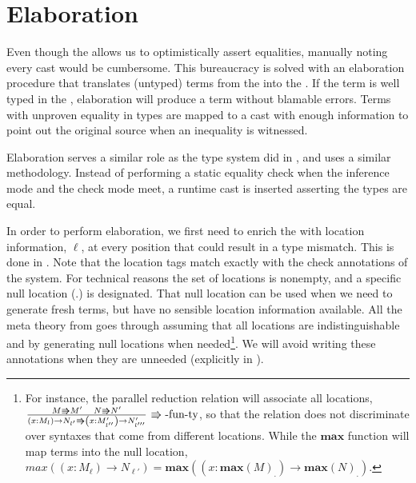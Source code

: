 \section{Elaboration}


Even though the \clang{} allows us to optimistically assert equalities, manually noting every cast would be cumbersome.
This bureaucracy is solved with an elaboration procedure that translates (untyped) terms from the \slang{} into the \clang{}.
If the term is well typed in the \slang{}, elaboration will produce a term without blamable errors.
Terms with unproven equality in types are mapped to a cast with enough information to point out the original source when an inequality is witnessed.
 
Elaboration serves a similar role as the \bidir{} type system did in , and uses a similar methodology.
Instead of performing a static equality check when the inference mode and the check mode meet, a runtime cast is inserted asserting the types are equal.

In order to perform elaboration, we first need to enrich the \slang{} with location information, $\ell$, at every position that could result in a type mismatch.
This is done in .
Note that the location tags match exactly with the check annotations of the \bidir{} system.
For technical reasons the set of locations is nonempty, and a specific null location ($.$) is designated.
That null location can be used when we need to generate fresh terms, but have no sensible location information available.
All the meta theory from  goes through assuming that all locations are indistinguishable and by generating null locations when needed\footnote{
  For instance, the parallel reduction relation will associate all locations,
    $\frac{M\Rrightarrow M'\quad N\Rrightarrow N'}{\left(x:M_{l}\right)\rightarrow N_{l'}\Rrightarrow\left(x:M'_{l''}\right)\rightarrow N'_{l'''}}\,\operatorname{\Rrightarrow-fun-ty}$,
    so that the relation does not discriminate over syntaxes that come from different locations.
  While the $\textbf{max}$ function will map terms into the null location,
    $max\left(\left(x:M_{\ell}\right)\rightarrow N_{\ell'}\right)=\textbf{max}\left(\left(x:\textbf{max}\left(M\right)_{.}\right)\rightarrow \textbf{max}\left(N\right)_{.}\right)$.
}.
We will avoid writing these annotations when they are unneeded (explicitly in ).

